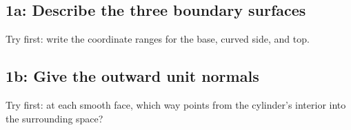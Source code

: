 \documentclass[11pt]{article}
\begin{document}
\begin{keepsection}
\begin{keepsection}
\subsection{1a: Describe the three boundary surfaces}

Try first: write the coordinate ranges for the base, curved side, and top.

\end{keepsection}

\begin{keepsection}
\subsection{1b: Give the outward unit normals}

Try first: at each smooth face, which way points from the cylinder’s interior into the surrounding space?

\end{keepsection}
\end{keepsection}
\end{document}

